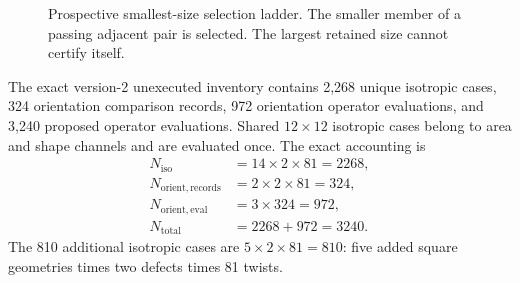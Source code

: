\documentclass[11pt]{article}
\begin{document}
\begin{figure}[htbp]
  \centering
  \caption{Prospective smallest-size selection ladder.  The smaller member of a passing
  adjacent pair is selected.  The largest retained size cannot certify itself.}
  \label{fig:size-selection-ladder}
\end{figure}

The exact version-2 unexecuted inventory contains 2,268 unique isotropic cases, 324
orientation comparison records, 972 orientation operator evaluations, and 3,240
proposed operator evaluations.  Shared $12\times12$ isotropic cases belong to area and
shape channels and are evaluated once.  The exact accounting is
\begin{align}
  N_{\mathrm{iso}}&=14\times2\times81=2268,\\
  N_{\mathrm{orient,records}}&=2\times2\times81=324,\\
  N_{\mathrm{orient,eval}}&=3\times324=972,\\
  N_{\mathrm{total}}&=2268+972=3240.
\end{align}
The 810 additional isotropic cases are
$5\times2\times81=810$: five added square geometries times two defects times 81 twists.
\end{document}

